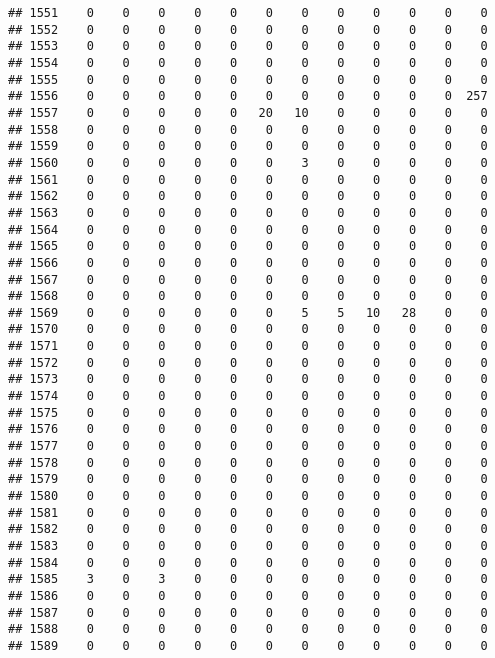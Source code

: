 \documentclass[]{article}
\begin{document}
\begin{verbatim}
## 1551    0    0    0    0    0    0    0    0    0    0    0    0
## 1552    0    0    0    0    0    0    0    0    0    0    0    0
## 1553    0    0    0    0    0    0    0    0    0    0    0    0
## 1554    0    0    0    0    0    0    0    0    0    0    0    0
## 1555    0    0    0    0    0    0    0    0    0    0    0    0
## 1556    0    0    0    0    0    0    0    0    0    0    0  257
## 1557    0    0    0    0    0   20   10    0    0    0    0    0
## 1558    0    0    0    0    0    0    0    0    0    0    0    0
## 1559    0    0    0    0    0    0    0    0    0    0    0    0
## 1560    0    0    0    0    0    0    3    0    0    0    0    0
## 1561    0    0    0    0    0    0    0    0    0    0    0    0
## 1562    0    0    0    0    0    0    0    0    0    0    0    0
## 1563    0    0    0    0    0    0    0    0    0    0    0    0
## 1564    0    0    0    0    0    0    0    0    0    0    0    0
## 1565    0    0    0    0    0    0    0    0    0    0    0    0
## 1566    0    0    0    0    0    0    0    0    0    0    0    0
## 1567    0    0    0    0    0    0    0    0    0    0    0    0
## 1568    0    0    0    0    0    0    0    0    0    0    0    0
## 1569    0    0    0    0    0    0    5    5   10   28    0    0
## 1570    0    0    0    0    0    0    0    0    0    0    0    0
## 1571    0    0    0    0    0    0    0    0    0    0    0    0
## 1572    0    0    0    0    0    0    0    0    0    0    0    0
## 1573    0    0    0    0    0    0    0    0    0    0    0    0
## 1574    0    0    0    0    0    0    0    0    0    0    0    0
## 1575    0    0    0    0    0    0    0    0    0    0    0    0
## 1576    0    0    0    0    0    0    0    0    0    0    0    0
## 1577    0    0    0    0    0    0    0    0    0    0    0    0
## 1578    0    0    0    0    0    0    0    0    0    0    0    0
## 1579    0    0    0    0    0    0    0    0    0    0    0    0
## 1580    0    0    0    0    0    0    0    0    0    0    0    0
## 1581    0    0    0    0    0    0    0    0    0    0    0    0
## 1582    0    0    0    0    0    0    0    0    0    0    0    0
## 1583    0    0    0    0    0    0    0    0    0    0    0    0
## 1584    0    0    0    0    0    0    0    0    0    0    0    0
## 1585    3    0    3    0    0    0    0    0    0    0    0    0
## 1586    0    0    0    0    0    0    0    0    0    0    0    0
## 1587    0    0    0    0    0    0    0    0    0    0    0    0
## 1588    0    0    0    0    0    0    0    0    0    0    0    0
## 1589    0    0    0    0    0    0    0    0    0    0    0    0

\end{verbatim}
\end{document}
